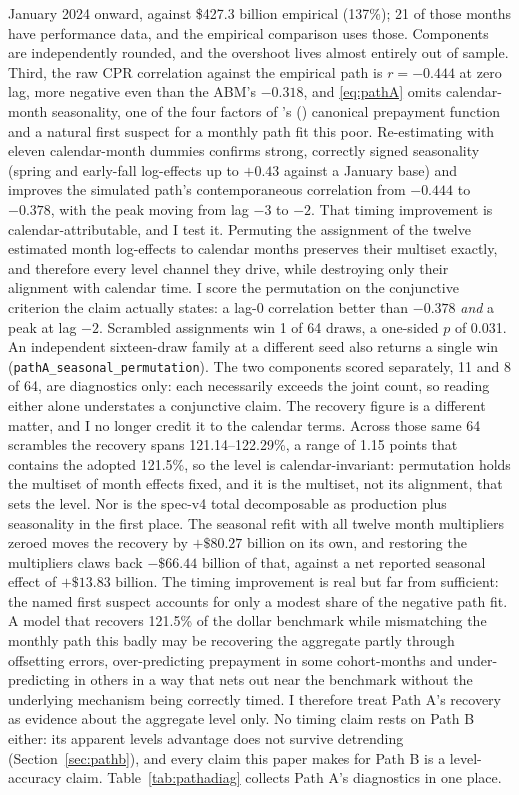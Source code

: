 \documentclass[12pt]{article}
\newcommand{\citepos}[1]{\citeauthor{#1}'s (\citeyear{#1})}
\begin{document}
January 2024 onward, against \$427.3 billion empirical (137\%); 21 of those months have performance data, and the empirical comparison uses those. Components are independently rounded, and the overshoot lives almost entirely out of sample. Third, the raw CPR correlation against the empirical path is $r = -0.444$ at zero lag, more negative even than the ABM's $-0.318$, and \eqref{eq:pathA} omits calendar-month seasonality, one of the four factors of \citepos{richard1989} canonical prepayment function and a natural first suspect for a monthly path fit this poor. Re-estimating with eleven calendar-month dummies confirms strong, correctly signed seasonality (spring and early-fall log-effects up to $+0.43$ against a January base) and improves the simulated path's contemporaneous correlation from $-0.444$ to $-0.378$, with the peak moving from lag $-3$ to $-2$. That timing improvement is calendar-attributable, and I test it. Permuting the assignment of the twelve estimated month log-effects to calendar months preserves their multiset exactly, and therefore every level channel they drive, while destroying only their alignment with calendar time. I score the permutation on the conjunctive criterion the claim actually states: a lag-0 correlation better than $-0.378$ \emph{and} a peak at lag $-2$. Scrambled assignments win 1 of 64 draws, a one-sided $p$ of 0.031. An independent sixteen-draw family at a different seed also returns a single win (\texttt{pathA\_seasonal\_permutation}). The two components scored separately, 11 and 8 of 64, are diagnostics only: each necessarily exceeds the joint count, so reading either alone understates a conjunctive claim. The recovery figure is a different matter, and I no longer credit it to the calendar terms. Across those same 64 scrambles the recovery spans 121.14--122.29\%, a range of 1.15 points that contains the adopted 121.5\%, so the level is calendar-invariant: permutation holds the multiset of month effects fixed, and it is the multiset, not its alignment, that sets the level. Nor is the spec-v4 total decomposable as production plus seasonality in the first place. The seasonal refit with all twelve month multipliers zeroed moves the recovery by $+\$80.27$ billion on its own, and restoring the multipliers claws back $-\$66.44$ billion of that, against a net reported seasonal effect of $+\$13.83$ billion. The timing improvement is real but far from sufficient: the named first suspect accounts for only a modest share of the negative path fit. A model that recovers 121.5\% of the dollar benchmark while mismatching the monthly path this badly may be recovering the aggregate partly through offsetting errors, over-predicting prepayment in some cohort-months and under-predicting in others in a way that nets out near the benchmark without the underlying mechanism being correctly timed. I therefore treat Path A's recovery as evidence about the aggregate level only. No timing claim rests on Path B either: its apparent levels advantage does not survive detrending (Section~\ref{sec:pathb}), and every claim this paper makes for Path B is a level-accuracy claim. Table~\ref{tab:pathadiag} collects Path A's diagnostics in one place.
\end{document}
